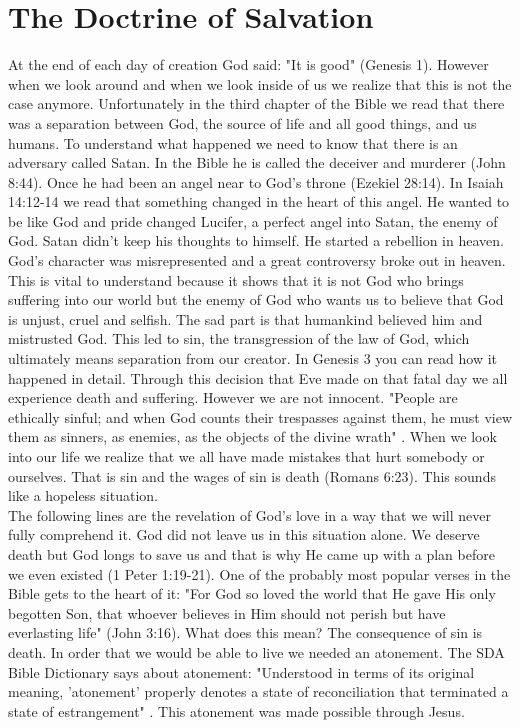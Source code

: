 \section{The Doctrine of Salvation}
At the end of each day of creation God said: "It is good" (Genesis 1). However when we look around and when we look inside of us we realize that this is not the case anymore. Unfortunately in the third chapter of the Bible we read that there was a separation between God, the source of life and all good things, and us humans. To understand what happened we need to know that there is an adversary called Satan. In the Bible he is called the deceiver and murderer (John 8:44). Once he had been an angel near to God's throne (Ezekiel 28:14). In Isaiah 14:12-14 we read that something changed in the heart of this angel. He wanted to be like God and pride changed Lucifer, a perfect angel into  Satan, the enemy of God. Satan didn't keep his thoughts to himself. He started a rebellion in heaven. God's character was misrepresented and a great controversy broke out in heaven. This is vital to understand because it shows that it is not God who brings suffering into our world but the enemy of God who wants us to believe that God is unjust, cruel and selfish. The sad part is that humankind believed him and mistrusted God. This led to sin, the transgression of the law of God, which ultimately means separation from our creator. In Genesis 3 you can read how it happened in detail. Through this decision that Eve made on that fatal day we all experience death and suffering. However we are not innocent. "People are ethically sinful; and when God counts their trespasses against them, he must view them as sinners, as enemies, as the objects of the divine wrath" \citep[p. 495]{ladd1993theology}. When we look into our life we realize that we all have made mistakes that hurt somebody or ourselves. That is sin and the wages of sin is death (Romans 6:23). This sounds like a hopeless situation.\\
The following lines are the revelation of God's love in a way that we will never fully comprehend it. God did not leave us in this situation alone. We deserve death but God longs to save us and that is why He came up with a plan before we even existed (1 Peter 1:19-21). One of the probably most popular verses in the Bible gets to the heart of it: "For God so loved the world that He gave His only begotten Son, that whoever believes in Him should not perish but have everlasting life" (John 3:16). What does this mean? 
The consequence of sin is death. In order that we would be able to live we needed an atonement. The SDA Bible Dictionary says about atonement: "Understood in terms of its original meaning, 'atonement' properly denotes a state of reconciliation that terminated a state of estrangement" \citep[p. 97]{neufeld1979seventh}. This atonement was made possible through Jesus.\\
